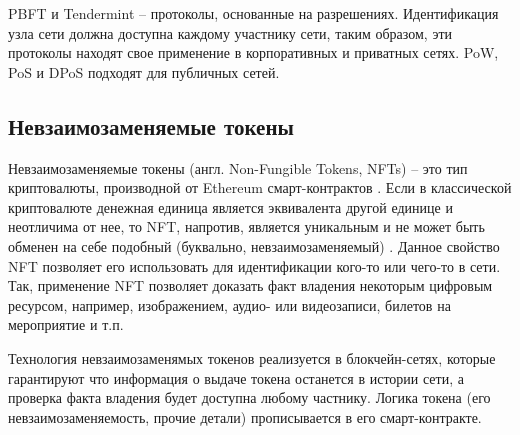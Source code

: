 \begin{table}[h!]
	\captionsetup{justification=raggedleft,singlelinecheck=off}
	\caption{Сравнение алгоритмов консенсуса}
\end{table}

PBFT и Tendermint -- протоколы, основанные на разрешениях. Идентификация узла сети должна доступна каждому участнику сети, таким образом, эти протоколы находят свое применение в корпоративных и приватных сетях. PoW, PoS и DPoS подходят для публичных сетей.


\subsection{Невзаимозаменяемые токены}

Невзаимозаменяемые токены (англ. Non-Fungible Tokens, NFTs) -- это тип криптовалюты, производной от Ethereum смарт-контрактов \cite{nft}. Если в классической криптовалюте денежная единица  является эквивалента другой единице и неотличима от нее, то NFT, напротив, является уникальным и не может быть обменен на себе подобный (буквально, невзаимозаменяемый) \cite{nft-pdf}. Данное свойство NFT позволяет его использовать для идентификации кого-то или чего-то в сети. Так, применение NFT позволяет доказать факт владения некоторым цифровым ресурсом, например, изображением, аудио- или видеозаписи, билетов на мероприятие и т.п.

Технология невзаимозаменямых токенов реализуется в блокчейн-сетях, которые гарантируют что информация о выдаче токена останется в истории сети, а проверка факта владения будет доступна любому частнику. Логика токена (его невзаимозаменяемость, прочие детали) прописывается в его смарт-контракте.


